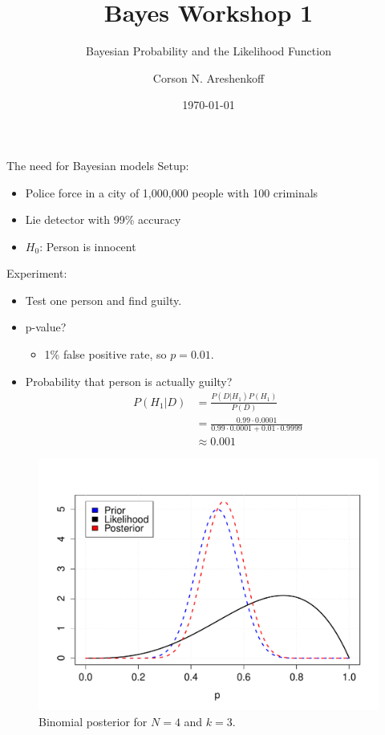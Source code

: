 \documentclass{beamer}
\title{Bayes Workshop 1}
\subtitle{Bayesian Probability and the Likelihood Function}
\date{\today}
\author{Corson N. Areshenkoff}
\institute{University of Victoria}
\begin{document}
\maketitle

\begin{frame}{The need for Bayesian models}
Setup:
	\begin{itemize}
		\item Police force in a city of 1,000,000 people with 100 criminals
		\item Lie detector with 99\% accuracy
		\item $H_0$: Person is innocent
	\end{itemize}
Experiment:
	\begin{itemize}
		\item Test one person and find guilty.
		\item p-value?
		\begin{itemize}
			\item 1\% false positive rate, so $p = 0.01$.
		\end{itemize}
		\item Probability that person is actually guilty?
		\begin{align*}
			P(H_1|D) &= \frac{P(D|H_1)P(H_1)}{P(D)} \\
					 &= \frac{0.99 \cdot 0.0001}
					   		 {0.99 \cdot 0.0001 + 0.01 \cdot 0.9999} \\
					 &\approx 0.001
		\end{align*}
	\end{itemize}
\end{frame}

\begin{frame}
    \begin{figure}
    \centering
        \includegraphics[width=.8\textwidth]{../images/binom_posterior.pdf}
        \caption{Binomial posterior for $N=4$ and $k=3$.}
    \end{figure}
\end{frame}
\end{document}
